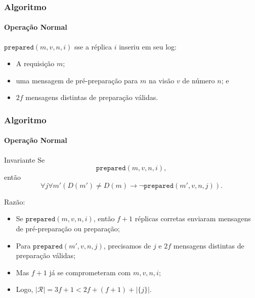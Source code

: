 \documentclass{beamer}
\begin{document}
\begin{frame}
  \frametitle{Algoritmo}
  \framesubtitle{Operação Normal}

  $\texttt{prepared}(m, v, n, i)$ sse a réplica $i$ inseriu em seu log:
  \begin{itemize}
    \item
      A requisição $m$;

    \item
      uma mensagem de pré-preparação para $m$ na visão $v$ de número $n$; e

    \item
      $2f$ mensagens distintas de preparação válidas.
  \end{itemize}
\end{frame}

\begin{frame}
  \frametitle{Algoritmo}
  \framesubtitle{Operação Normal}

  \begin{block}{Invariante}
    Se $$\texttt{prepared}(m, v, n, i),$$ então $$\forall j \forall m' (D(m') \neq D(m) \to \lnot \texttt{prepared}(m', v, n, j)).$$
  \end{block}

  Razão:
  \begin{itemize}
    \item
      Se $\texttt{prepared}(m, v, n, i)$, então $f + 1$ réplicas corretas enviaram mensagens de pré-preparação ou preparação;

    \item
      Para $\texttt{prepared}(m', v, n, j)$, precisamos de $j$ e $2f$ mensagens distintas de preparação válidas;

    \item
      Mas $f + 1$ já se comprometeram com $m, v, n, i$;
      
    \item
      Logo, $|\mathcal{R}| = 3f + 1 < 2f + (f + 1) + |\{j\}|$.
  \end{itemize}
\end{frame}
\end{document}
